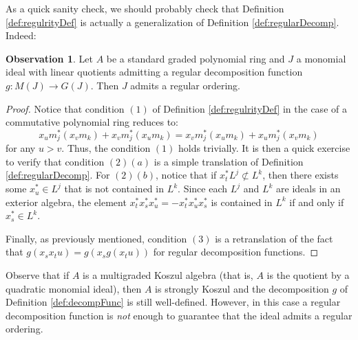 \documentclass[10pt]{amsart}
\theoremstyle{definition}
\newtheorem{obs}[theorem]{Observation}
\theoremstyle{remark}
\newtheorem{the context}[theorem]{The Context}
\numberwithin{equation}{theorem}
\numberwithin{equation}{section}
\renewcommand{\leq}{\leqslant}
\begin{document}

As a quick sanity check, we should probably check that Definition \ref{def:regulrityDef} is actually a generalization of Definition \ref{def:regularDecomp}. Indeed:

\begin{obs}
Let $A$ be a standard graded polynomial ring and $J$ a monomial ideal with linear quotients admitting a regular decomposition function $g : M(J) 
\to G(J)$. Then $J$ admits a regular ordering.
\end{obs}

\begin{proof}
Notice that condition $(1)$ of Definition \ref{def:regulrityDef} in the case of a commutative polynomial ring reduces to:
$$x_u m_j^* (x_v m_k) + x_v m_j^* (x_u m_k) = x_v m_j^* (x_u m_k) + x_u m_j^* (x_v m_k)$$
for any $u > v$. Thus, the condition $(1)$ holds trivially. It is then a quick exercise to verify that condition $(2)(a)$ is a simple translation of Definition \ref{def:regularDecomp}. For $(2)(b)$, notice that if $x_t^* L^j \not\subset L^k$, then there exists some $x_u^* \in L^j$ that is not contained in $L^k$. Since each $L^j$ and $L^k$ are ideals in an exterior algebra, the element $x_t^* x_s^* x_u^* = - x_t^* x_u^* x_s^*$ is contained in $L^k$ if and only if $x_s^* \in L^k$.

Finally, as previously mentioned, condition $(3)$ is a retranslation of the fact that $g(x_s x_t u) = g(x_s g(x_tu))$ for regular decomposition functions.
\end{proof}

Observe that if $A$ is a multigraded Koszul algebra (that is, $A$ is the quotient by a quadratic monomial ideal), then $A$ is strongly Koszul and the decomposition $g$ of Definition \ref{def:decompFunc} is still well-defined. However, in this case a regular decomposition function is \emph{not} enough to guarantee that the ideal admits a regular ordering.
\end{document}
